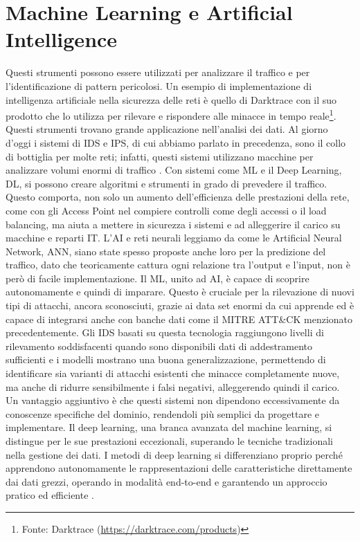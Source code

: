     \section{Machine Learning e Artificial Intelligence}
        Questi strumenti possono essere utilizzati per analizzare il traffico e per l'identificazione di pattern pericolosi. Un esempio di implementazione di intelligenza artificiale nella sicurezza delle reti è quello di Darktrace con il suo prodotto che lo utilizza per rilevare e rispondere alle minacce in tempo reale\footnote{Fonte: Darktrace (\url{https://darktrace.com/products})}. Questi strumenti trovano grande applicazione nell'analisi dei dati. Al giorno d'oggi i sistemi di IDS e IPS, di cui abbiamo parlato in precedenza, sono il collo di bottiglia per molte reti; infatti, questi sistemi utilizzano macchine per analizzare volumi enormi di traffico \cite{ml_intro}. Con sistemi come ML e il Deep Learning, DL, si possono creare algoritmi e strumenti in grado di prevedere il traffico. Questo comporta, non solo un aumento dell'efficienza delle prestazioni della rete, come con gli Access Point nel compiere controlli come degli accessi o il load balancing, ma aiuta a mettere in sicurezza i sistemi e ad alleggerire il carico su macchine e reparti IT. L'AI e reti neurali leggiamo da \cite{ann_paper} come le Artificial Neural Network, ANN, siano state spesso proposte anche loro per la predizione del traffico, dato che teoricamente cattura ogni relazione tra l'output e l'input, non è però di facile implementazione. Il ML, unito ad AI, è capace di scoprire autonomamente e quindi di imparare. Questo è cruciale per la rilevazione di nuovi tipi di attacchi, ancora sconosciuti, grazie ai data set enormi da cui apprende ed è capace di integrarsi anche con banche dati come il MITRE ATT\&CK menzionato precedentemente. Gli IDS basati su questa tecnologia raggiungono livelli di rilevamento soddisfacenti quando sono disponibili dati di addestramento sufficienti e i modelli mostrano una buona generalizzazione, permettendo di identificare sia varianti di attacchi esistenti che minacce completamente nuove, ma anche di ridurre sensibilmente i falsi negativi, alleggerendo quindi il carico. Un vantaggio aggiuntivo è che questi sistemi non dipendono eccessivamente da conoscenze specifiche del dominio, rendendoli più semplici da progettare e implementare. Il deep learning, una branca avanzata del machine learning, si distingue per le sue prestazioni eccezionali, superando le tecniche tradizionali nella gestione dei dati. I metodi di deep learning si differenziano proprio perché apprendono autonomamente le rappresentazioni delle caratteristiche direttamente dai dati grezzi, operando in modalità end-to-end e garantendo un approccio pratico ed efficiente \cite{ml_ids_paper}.
    
